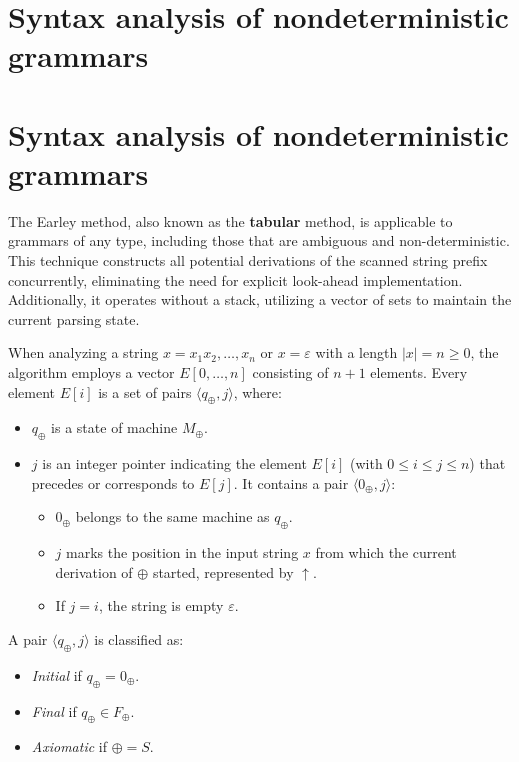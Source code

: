 \section{Syntax analysis of nondeterministic grammars}

\section{Syntax analysis of nondeterministic grammars}
The Earley method, also known as the \textbf{tabular} method, is applicable to grammars of any type, including those that are ambiguous and non-deterministic. 
This technique constructs all potential derivations of the scanned string prefix concurrently, eliminating the need for explicit look-ahead implementation.
Additionally, it operates without a stack, utilizing a vector of sets to maintain the current parsing state.

When analyzing a string $x = x_1 x_2, \dots, x_n$ or $x = \varepsilon$ with a length $|x| = n \geq 0$, the algorithm employs a vector $E\left[ 0, \dots, n \right]$ consisting of $n+1$ elements.
Every element $E[i]$ is a set of pairs $\langle q_\oplus, j\rangle$, where:
\begin{itemize}
    \item $q_\oplus$ is a state of machine $M_\oplus$. 
    \item $j$ is an integer pointer indicating the element $E[i]$ (with $0 \leq i \leq j \leq n$) that precedes or corresponds to $E[j]$. 
        It contains a pair $\langle 0_\oplus, j \rangle$: 
      \begin{itemize}
          \item $0_\oplus$ belongs to the same machine as $q_\oplus$.
          \item $j$ marks the position in the input string $x$ from which the current derivation of $\oplus$ started, represented by $\uparrow$. 
          \item If $j = i$, the string is empty $\varepsilon$. 
      \end{itemize}
\end{itemize}
A pair $\langle q_\oplus, j \rangle$ is classified as:
\begin{itemize}
    \item \textit{Initial} if $q_\oplus = 0_\oplus$.
    \item \textit{Final} if $q_\oplus \in F_\oplus$.
    \item \textit{Axiomatic} if $\oplus = S$.
\end{itemize}

